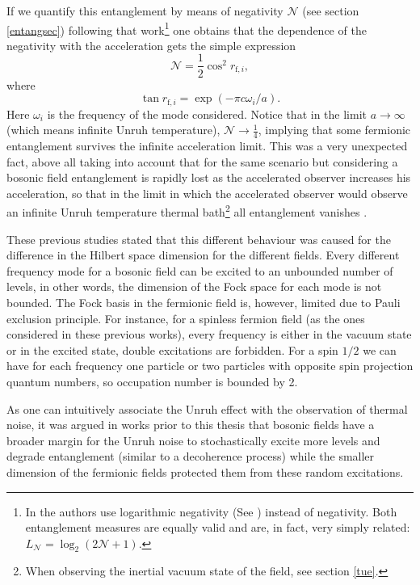 If we quantify this entanglement by means of negativity $\mathcal{N}$ (see section \ref{entangsec}) following that work\footnote{In \cite{AlsingSchul}  the authors use logarithmic negativity (See \cite{logneg})  instead of negativity. Both entanglement measures are equally valid and are, in fact, very simply related: $L_{\mathcal{N}}=\log_2(2\mathcal N+1)$.} one obtains that the dependence of the negativity with the acceleration gets the simple expression 
\begin{equation}
\mathcal{N}=\frac12\cos^2 r_{\text{f},i},
\end{equation}
where
\begin{equation}
\tan r_{\text{f},i}=\exp(-\pi c{{\omega_i}}/{a}).
\end{equation}
Here $\omega_i$ is the frequency of the mode considered. Notice that in the limit $a\rightarrow\infty$ (which means infinite Unruh temperature), $\mathcal{N}\rightarrow\frac14$, implying that some fermionic entanglement survives the infinite acceleration limit. This was a very unexpected fact, above all taking into account that for the same scenario but considering a bosonic field entanglement is rapidly lost as the accelerated observer increases his acceleration, so that in the limit in which the accelerated observer would observe an infinite Unruh temperature thermal bath\footnote{When observing the inertial vacuum state of the field, see section \ref{tue}.} all entanglement vanishes \cite{Alicefalls}.
 
These previous studies stated that this different behaviour was caused for the difference in the Hilbert space dimension for the different fields. Every different frequency mode for a bosonic field can be excited to an unbounded number of levels, in other words, the dimension of the Fock space for each mode is not bounded. The Fock basis in the fermionic field is, however, limited due to Pauli exclusion principle. For instance, for a spinless fermion field (as the ones considered in these previous works), every frequency is either in the vacuum state or in the excited state, double excitations are forbidden.  For a spin $1/2$ we can have for each frequency one particle or two particles with opposite spin projection quantum numbers, so occupation number is bounded by 2.

As one can intuitively associate the Unruh effect with the observation of thermal noise, it was argued in works prior to this thesis that bosonic fields have a broader margin for the Unruh noise to stochastically excite more levels and degrade entanglement (similar to a decoherence process) while the smaller dimension of the fermionic fields protected them from these random excitations. 

